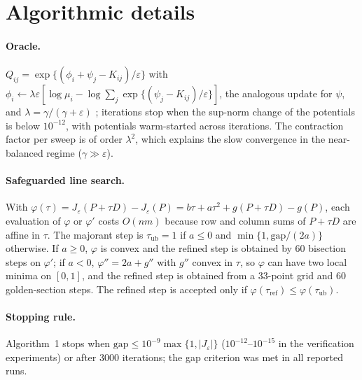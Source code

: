 \documentclass[12pt]{article}
\begin{document}
\section{Algorithmic details}\label{sec:alg}

\paragraph{Oracle.} $Q_{ij}=\exp\{(\phi_i+\psi_j-K_{ij})/\varepsilon\}$ with $\phi_i\leftarrow\lambda\varepsilon[\log\mu_i-\log\sum_j\exp\{(\psi_j-K_{ij})/\varepsilon\}]$, the analogous update for $\psi$, and $\lambda=\gamma/(\gamma+\varepsilon)$ \citep{chizat2018scaling}; iterations stop when the sup-norm change of the potentials is below $10^{-12}$, with potentials warm-started across iterations. The contraction factor per sweep is of order $\lambda^2$, which explains the slow convergence in the near-balanced regime ($\gamma\gg\varepsilon$).

\paragraph{Safeguarded line search.} With $\varphi(\tau)=J_\varepsilon(P+\tau D)-J_\varepsilon(P)=b\tau+a\tau^2+g(P+\tau D)-g(P)$, each evaluation of $\varphi$ or $\varphi'$ costs $O(nm)$ because row and column sums of $P+\tau D$ are affine in $\tau$. The majorant step is $\tau_{\mathrm{ub}}=1$ if $a\le0$ and $\min\{1,\mathrm{gap}/(2a)\}$ otherwise. If $a\ge0$, $\varphi$ is convex and the refined step is obtained by 60 bisection steps on $\varphi'$; if $a<0$, $\varphi''=2a+g''$ with $g''$ convex in $\tau$, so $\varphi$ can have two local minima on $[0,1]$, and the refined step is obtained from a 33-point grid and 60 golden-section steps. The refined step is accepted only if $\varphi(\tau_{\mathrm{ref}})\le\varphi(\tau_{\mathrm{ub}})$.

\paragraph{Stopping rule.} Algorithm~1 stops when $\mathrm{gap}\le10^{-9}\max\{1,|J_\varepsilon|\}$ ($10^{-12}$--$10^{-15}$ in the verification experiments) or after 3000 iterations; the gap criterion was met in all reported runs.
\end{document}
